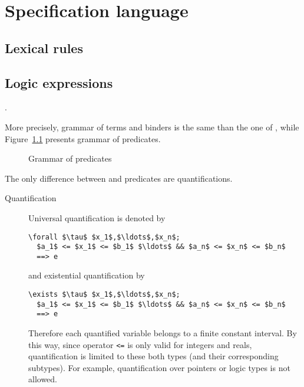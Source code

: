 
\chapter{Specification language}
\label{chap:base}


\section{Lexical rules}

\nodiff


\section{Logic expressions}
\label{sec:expressions}

.

More precisely, grammar of terms and binders is the same than the one of \acsl,
while Figure~\ref{fig:gram:pred} presents grammar of predicates.
\begin{figure}[htbp]
  \begin{cadre}
    
  \end{cadre}
  \caption{Grammar of predicates}
\label{fig:gram:pred}
\end{figure}
The only difference between \eacsl and \acsl predicates are
quantifications.

\begin{description}
\item[Quantification] Universal quantification is denoted by
\begin{lstlisting}
\forall $\tau$ $x_1$,$\ldots$,$x_n$;
  $a_1$ <= $x_1$ <= $b_1$ $\ldots$ && $a_n$ <= $x_n$ <= $b_n$
  ==> e
\end{lstlisting} and existential quantification by
\begin{lstlisting}
\exists $\tau$ $x_1$,$\ldots$,$x_n$;
  $a_1$ <= $x_1$ <= $b_1$ $\ldots$ && $a_n$ <= $x_n$ <= $b_n$
  ==> e
\end{lstlisting}
Therefore each quantified variable belongs to a finite constant interval. By
this way, since operator \lstinline|<=| is only valid for integers and reals,
quantification is limited to these both types (and their corresponding
subtypes). For example, quantification over \C pointers or logic types is not
allowed.
\end{description}

